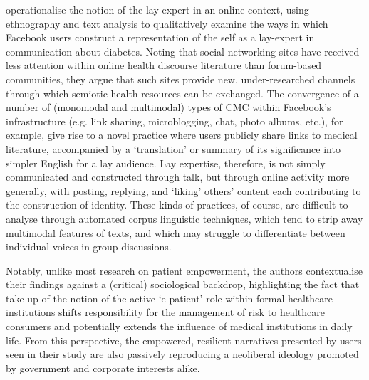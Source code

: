 
\textcite{koteyko2015performing} operationalise the notion of the lay\hyp{}expert in an online context, using ethnography and text analysis to qualitatively examine the ways in which Facebook users construct a representation of the self as a lay\hyp{}expert in communication about diabetes. Noting that social networking sites have received less attention within online health discourse literature than \gls{forum}\hyp{}based communities, they argue that such sites provide new, under\hyp{}researched channels through which semiotic health resources can be exchanged. The convergence of a number of (monomodal and multimodal) types of \gls{CMC} within Facebook's infrastructure (e.g. link sharing, microblogging, chat, photo albums, etc.), for example, give rise to a novel practice where users publicly share links to medical literature, accompanied by a `translation' or summary of its significance into simpler English for a lay audience. Lay expertise, therefore, is not simply communicated and constructed through talk, but through online activity more generally, with posting, replying, and `liking' others' content each contributing to the construction of identity. These kinds of practices, of course, are difficult to analyse through automated corpus linguistic techniques, which tend to strip away multimodal features of texts, and which may struggle to differentiate between individual voices in group discussions. 

Notably, unlike most research on patient empowerment, the authors contextualise their findings against a (critical) sociological backdrop, highlighting the fact that take\hyp{}up of the notion of the active `e\hyp{}patient' role within formal healthcare institutions shifts responsibility for the management of risk to healthcare consumers and potentially extends the influence of medical institutions in daily life. From this perspective, the empowered, resilient narratives presented by users seen in their study are also passively reproducing a neoliberal ideology promoted by government and corporate interests alike.

